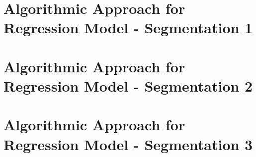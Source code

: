 \author{
		Corporate Strategy and Planning Management\\
		Bank of New York Mellon Corporation\\
}



\thispagestyle{empty}
\printtitle									%
  	\vfill
\printauthor
\newpage

\tableofcontents
\thispagestyle{empty}
\newpage

% 
% 

\ifdefined\SegmentOne
\section{Algorithmic Approach for Regression Model - Segmentation 1}

\fi

\ifdefined\SegmentTwo
\section{Algorithmic Approach for Regression Model - Segmentation 2}

\fi

\ifdefined\SegmentThree
\section{Algorithmic Approach for Regression Model - Segmentation 3}

\fi
% 



